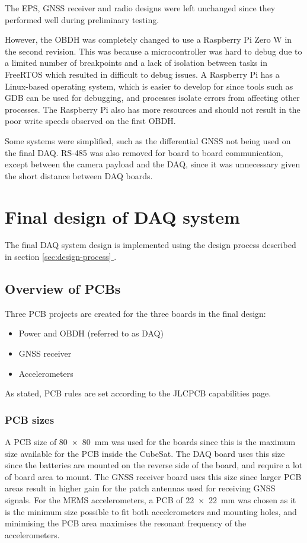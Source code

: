 \documentclass[]{report}
\newcommand*{\secref}[1]{section \hyperref[{#1}]{\ref*{#1} \nameref*{#1}}}
\begin{document}
The EPS, GNSS receiver and radio designs were left unchanged since they performed well during preliminary testing.

However, the OBDH was completely changed to use a Raspberry Pi Zero W in the second revision. This was because a microcontroller was hard to debug due to a limited number of breakpoints and a lack of isolation between tasks in FreeRTOS which resulted in difficult to debug issues. A Raspberry Pi has a Linux-based operating system, which is easier to develop for since tools such as GDB can be used for debugging, and processes isolate errors from affecting other processes. The Raspberry Pi also has more resources and should not result in the poor write speeds observed on the first OBDH.

Some systems were simplified, such as the differential GNSS not being used on the final DAQ. RS-485 was also removed for board to board communication, except between the camera payload and the DAQ, since it was unnecessary given the short distance between DAQ boards.

\chapter{Final design of DAQ system}

The final DAQ system design is implemented using the design process described in \secref{sec:design-process}.

\section{Overview of PCBs}

Three PCB projects are created for the three boards in the final design:
\begin{itemize}
  \item Power and OBDH (referred to as DAQ)
  \item GNSS receiver
  \item Accelerometers
\end{itemize}

As stated, PCB rules are set according to the JLCPCB capabilities page.

\subsection{PCB sizes}
A PCB size of \SI{80 x 80}{\milli\metre} was used for the  boards since this is the maximum size available for the PCB inside the CubeSat. The DAQ board uses this size since the batteries are mounted on the reverse side of the board, and require a lot of board area to mount. The GNSS receiver board uses this size since larger PCB areas result in higher gain for the patch antennas used for receiving GNSS signals. For the MEMS accelerometers, a PCB of \SI{22 x 22}{\milli\metre} was chosen as it is the minimum size possible to fit both accelerometers and mounting holes, and minimising the PCB area maximises the resonant frequency of the accelerometers.
\end{document}
